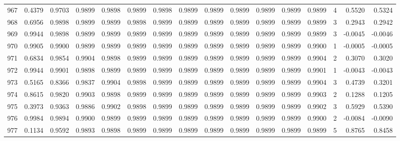 \begin{tabular}{lrrrrrrrrrrrrrrr}
967 &      0.4379 &  0.9703 &  0.9899 &  0.9898 &  0.9899 &  0.9898 &  0.9899 &  0.9899 &  0.9899 &  0.9899 &   0.9899 &     0.9899 &      4 &                    0.5520 &                     0.5324 \\
968 &      0.6956 &  0.9898 &  0.9899 &  0.9899 &  0.9898 &  0.9899 &  0.9899 &  0.9899 &  0.9899 &  0.9899 &   0.9899 &     0.9899 &      3 &                    0.2943 &                     0.2942 \\
969 &      0.9944 &  0.9898 &  0.9899 &  0.9899 &  0.9899 &  0.9899 &  0.9899 &  0.9899 &  0.9899 &  0.9899 &   0.9899 &     0.9899 &      3 &                   -0.0045 &                    -0.0046 \\
970 &      0.9905 &  0.9900 &  0.9899 &  0.9899 &  0.9899 &  0.9899 &  0.9899 &  0.9899 &  0.9899 &  0.9899 &   0.9899 &     0.9900 &      1 &                   -0.0005 &                    -0.0005 \\
971 &      0.6834 &  0.9854 &  0.9904 &  0.9898 &  0.9899 &  0.9899 &  0.9899 &  0.9899 &  0.9899 &  0.9899 &   0.9899 &     0.9904 &      2 &                    0.3070 &                     0.3020 \\
972 &      0.9944 &  0.9901 &  0.9898 &  0.9899 &  0.9899 &  0.9899 &  0.9899 &  0.9899 &  0.9899 &  0.9899 &   0.9899 &     0.9901 &      1 &                   -0.0043 &                    -0.0043 \\
973 &      0.5165 &  0.8366 &  0.9837 &  0.9904 &  0.9898 &  0.9899 &  0.9899 &  0.9899 &  0.9899 &  0.9899 &   0.9899 &     0.9904 &      3 &                    0.4739 &                     0.3201 \\
974 &      0.8615 &  0.9820 &  0.9903 &  0.9898 &  0.9899 &  0.9899 &  0.9899 &  0.9899 &  0.9899 &  0.9899 &   0.9899 &     0.9903 &      2 &                    0.1288 &                     0.1205 \\
975 &      0.3973 &  0.9363 &  0.9886 &  0.9902 &  0.9898 &  0.9899 &  0.9899 &  0.9899 &  0.9899 &  0.9899 &   0.9899 &     0.9902 &      3 &                    0.5929 &                     0.5390 \\
976 &      0.9984 &  0.9894 &  0.9900 &  0.9899 &  0.9899 &  0.9899 &  0.9899 &  0.9899 &  0.9899 &  0.9899 &   0.9899 &     0.9900 &      2 &                   -0.0084 &                    -0.0090 \\
977 &      0.1134 &  0.9592 &  0.9893 &  0.9898 &  0.9899 &  0.9899 &  0.9899 &  0.9899 &  0.9899 &  0.9899 &   0.9899 &     0.9899 &      5 &                    0.8765 &                     0.8458 \\

\end{tabular}
